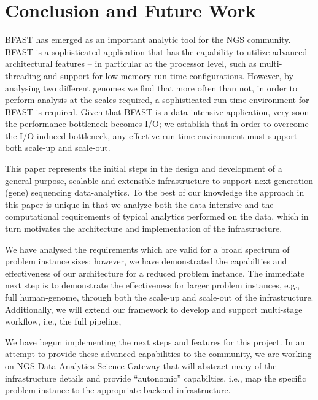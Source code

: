 \documentclass{acm_proc_article-sp}
\begin{document}


\section{Conclusion and Future Work}

BFAST has emerged as an important analytic tool for the NGS
community. BFAST is a sophisticated application that has the
capability to utilize advanced architectural features -- in particular
at the processor level, such as multi-threading and support for low
memory run-time configurations. However, by analysing two different
genomes we find that more often than not, in order to perform analysis
at the scales required, a sophisticated run-time environment for BFAST
is required. Given that BFAST is a data-intensive application, very
soon the performance bottleneck becomes I/O; we establish that in
order to overcome the I/O induced bottleneck, any effective run-time
environment must support both scale-up and scale-out. 

This paper represents the initial steps in the design and development
of a general-purpose, scalable and extensible infrastructure to
support next-generation (gene) sequencing data-analytics. To the best
of our knowledge the approach in this paper is unique in that we
analyze both the data-intensive and the computational requirements of
typical analytics performed on the data, which in turn motivates the
architecture and implementation of the infrastructure. 

We have analysed the requirements which are valid for a broad spectrum
of problem instance sizes; however, we have demonstrated the
capabilties and effectiveness of our architecture for a reduced
problem instance. The immediate next step is to demonstrate the
effectiveness for larger problem instances, e.g., full human-genome,
through both the scale-up and scale-out of the infrastructure.
Additionally, we will extend our framework to develop and support
multi-stage workflow, i.e., the full pipeline,
 
We have begun implementing the next steps and features for this
project. In an attempt to provide these advanced capabilities to the
community, we are working on NGS Data Analytics Science Gateway that
will abstract many of the infrastructure details and provide
``autonomic'' capabilties, i.e., map the specific problem instance to
the appropriate backend infrastructure.




\end{document}
